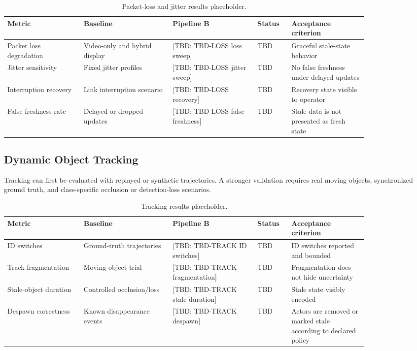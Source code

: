\documentclass[11pt,a4paper]{article}
\newcommand{\tbd}[1]{\textcolor{publicationred}{[TBD: #1]}}
\begin{document}
\begin{table}[H]
\centering
\small
\caption{Packet-loss and jitter results placeholder.}
\label{tab:loss-placeholder}
\begin{tabular}{@{}L{0.18\linewidth}L{0.21\linewidth}L{0.20\linewidth}L{0.08\linewidth}L{0.18\linewidth}@{}}
\toprule
Metric & Baseline & Pipeline B & Status & Acceptance criterion \\
\midrule
Packet loss degradation & Video-only and hybrid display & \tbd{TBD-LOSS loss sweep} & TBD & Graceful stale-state behavior \\
Jitter sensitivity & Fixed jitter profiles & \tbd{TBD-LOSS jitter sweep} & TBD & No false freshness under delayed updates \\
Interruption recovery & Link interruption scenario & \tbd{TBD-LOSS recovery} & TBD & Recovery state visible to operator \\
False freshness rate & Delayed or dropped updates & \tbd{TBD-LOSS false freshness} & TBD & Stale data is not presented as fresh state \\
\bottomrule
\end{tabular}
\normalsize
\end{table}

\subsection{Dynamic Object Tracking}

Tracking can first be evaluated with replayed or synthetic trajectories. A stronger validation requires real moving objects, synchronized ground truth, and class-specific occlusion or detection-loss scenarios.

\begin{table}[H]
\centering
\small
\caption{Tracking results placeholder.}
\label{tab:track-placeholder}
\begin{tabular}{@{}L{0.18\linewidth}L{0.21\linewidth}L{0.20\linewidth}L{0.08\linewidth}L{0.18\linewidth}@{}}
\toprule
Metric & Baseline & Pipeline B & Status & Acceptance criterion \\
\midrule
ID switches & Ground-truth trajectories & \tbd{TBD-TRACK ID switches} & TBD & ID switches reported and bounded \\
Track fragmentation & Moving-object trial & \tbd{TBD-TRACK fragmentation} & TBD & Fragmentation does not hide uncertainty \\
Stale-object duration & Controlled occlusion/loss & \tbd{TBD-TRACK stale duration} & TBD & Stale state visibly encoded \\
Despawn correctness & Known disappearance events & \tbd{TBD-TRACK despawn} & TBD & Actors are removed or marked stale according to declared policy \\
\bottomrule
\end{tabular}
\normalsize
\end{table}
\end{document}
